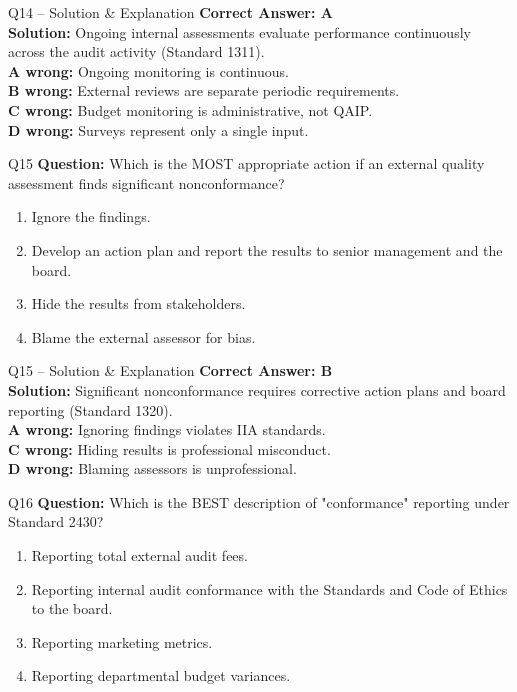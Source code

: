 \documentclass[aspectratio=169,10pt]{beamer}
\begin{document}
	\begin{frame}[t]{Q14 -- Solution \& Explanation}
		\small
		\textbf{Correct Answer: A} \\[4pt]
		\textbf{Solution:} Ongoing internal assessments evaluate performance continuously across the audit activity (Standard 1311). \\[4pt]
		\textbf{A wrong:} Ongoing monitoring is continuous. \\[2pt]
		\textbf{B wrong:} External reviews are separate periodic requirements. \\[2pt]
		\textbf{C wrong:} Budget monitoring is administrative, not QAIP. \\[2pt]
		\textbf{D wrong:} Surveys represent only a single input.
	\end{frame}
	
	\begin{frame}[t]{Q15}
		\small
		\textbf{Question:} Which is the MOST appropriate action if an external quality assessment finds significant nonconformance?
		\begin{enumerate}[label=\Alph*.,itemsep=1pt,topsep=2pt]
			\item Ignore the findings.
			\item Develop an action plan and report the results to senior management and the board.
			\item Hide the results from stakeholders.
			\item Blame the external assessor for bias.
		\end{enumerate}
	\end{frame}
	
	\begin{frame}[t]{Q15 -- Solution \& Explanation}
		\small
		\textbf{Correct Answer: B} \\[4pt]
		\textbf{Solution:} Significant nonconformance requires corrective action plans and board reporting (Standard 1320). \\[4pt]
		\textbf{A wrong:} Ignoring findings violates IIA standards. \\[2pt]
		\textbf{C wrong:} Hiding results is professional misconduct. \\[2pt]
		\textbf{D wrong:} Blaming assessors is unprofessional.
	\end{frame}
	
	\begin{frame}[t]{Q16}
		\small
		\textbf{Question:} Which is the BEST description of "conformance" reporting under Standard 2430?
		\begin{enumerate}[label=\Alph*.,itemsep=1pt,topsep=2pt]
			\item Reporting total external audit fees.
			\item Reporting internal audit conformance with the Standards and Code of Ethics to the board.
			\item Reporting marketing metrics.
			\item Reporting departmental budget variances.
		\end{enumerate}
	\end{frame}
	
\end{document}
